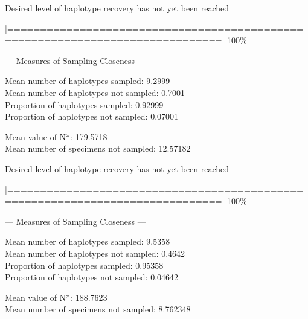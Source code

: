 {\noindent Desired level of haplotype recovery has not yet been reached 

\vspace{2mm}

\noindent |==============================================================================| 100\%

\vspace{3mm}

\noindent --- Measures of Sampling Closeness ---

\vspace{2mm} 
 
\noindent Mean number of haplotypes sampled: 9.2999  \\
Mean number of haplotypes not sampled: 0.7001 \\
Proportion of haplotypes sampled: 0.92999 \\
Proportion of haplotypes not sampled: 0.07001    

\vspace{2mm} 
 
\noindent Mean value of N*: 179.5718  \\
Mean number of specimens not sampled: 12.57182 

\vspace{3mm}
 
\noindent Desired level of haplotype recovery has not yet been reached

\vspace{2mm}

\noindent |==============================================================================| 100\%

\vspace{3mm}

\noindent --- Measures of Sampling Closeness ---

\vspace{2mm} 
 
\noindent Mean number of haplotypes sampled: 9.5358 \\
Mean number of haplotypes not sampled: 0.4642  \\
Proportion of haplotypes sampled: 0.95358  \\
Proportion of haplotypes not sampled: 0.04642   

\vspace{2mm} 
 
\noindent Mean value of N*: 188.7623 \\
Mean number of specimens not sampled: 8.762348 

\vspace{3mm}
 
}
